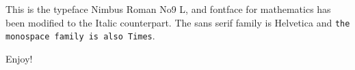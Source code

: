 \documentclass{article}
\begin{document}
	This is the typeface Nimbus Roman No9 L, and fontface for mathematics has been modified to the Italic counterpart.
	\textsf{The sans serif family is Helvetica} and \texttt{the monospace family is also Times}.
	
	Enjoy!
\end{document}
